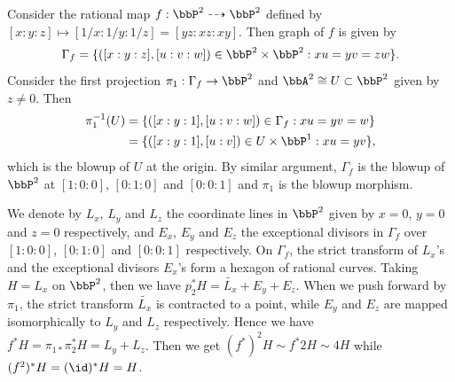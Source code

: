 \begin{example}
	Consider the rational map $f: \bbP^2 \dashrightarrow \bbP^2$ defined by $[x:y:z] \mapsto [1/x:1/y:1/z] = [yz:xz:xy]$.
	Then graph of $f$ is given by
	\[ \Gamma_f = \{ ([x:y:z], [u:v:w]) \in \bbP^2 \times \bbP^2 : xu = yv = zw \}. \]
	Consider the first projection $\pi_1: \Gamma_f \to \bbP^2$ and $\bbA^2 \cong U \subset \bbP^2$ given by $z \neq 0$.
	Then
	\begin{align*}
		\pi_1^{-1}(U) & = \{ ([x:y:1], [u:v:w]) \in \Gamma_f : xu = yv = w \}   \\
		              & = \{ ([x:y:1], [u:v]) \in U \times \bbP^1 : xu = yv \},
	\end{align*}
	which is the blowup of $U$ at the origin.
	By similar argument, $\Gamma_f$ is the blowup of $\bbP^2$ at $[1:0:0]$, $[0:1:0]$ and $[0:0:1]$ and $\pi_1$ is the blowup morphism.

	We denote by $L_x$, $L_y$ and $L_z$ the coordinate lines in $\bbP^2$ given by $x=0$, $y=0$ and $z=0$ respectively,
	and $E_x$, $E_y$ and $E_z$ the exceptional divisors in $\Gamma_f$ over $[1:0:0]$, $[0:1:0]$ and $[0:0:1]$ respectively.
	On $\Gamma_f$, the strict transform of $L_x$'s and the exceptional divisors $E_x$'s form a hexagon of rational curves.
	Taking $H = L_x$ on $\bbP^2$, then we have $p_2^* H = \tilde{L_x} + E_y + E_z$.
	When we push forward by $\pi_1$, the strict transform $\tilde{L_x}$ is contracted to a point, while $E_y$ and $E_z$ are mapped isomorphically to $L_y$ and $L_z$ respectively.
	Hence we have $f^* H = \pi_{1*} \pi_2^* H = L_y + L_z$.
	Then we get $(f^*)^2 H \sim f^*2H \sim 4H$ while $(f^2)^*H = (\id)^* H = H$.
\end{example}

